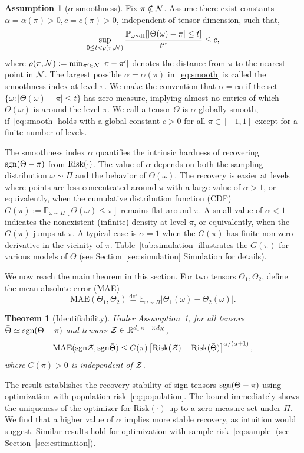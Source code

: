 \documentclass[11pt]{article}
\theoremstyle{plain}
\newtheorem{thm}{Theorem}
\theoremstyle{definition}
\newtheorem{assumption}{Assumption}
\def\sign{\textup{sgn}}
\def\risk{\textup{Risk}}
\begin{document}
\begin{assumption}[$\alpha$-smoothness]\label{ass:margin} 
Fix $\pi\notin \mathcal{N}$. Assume there exist constants $\alpha=\alpha(\pi)> 0, c=c(\pi) >0$, independent of tensor dimension, such that, 
\begin{equation}\label{eq:smooth}
\sup_{0\leq t<\rho(\pi, \mathcal{N})}{\mathbb{P}_{\omega \sim \Pi}[|\Theta (\omega)-\pi|\leq t ]\over t^\alpha} \leq c,
\end{equation}
where $\rho(\pi,\mathcal{N}):=\min_{\pi'\in \mathcal{N}}|\pi-\pi'|$ denotes the distance from $\pi$ to the nearest point in $\mathcal{N}$. The largest possible $\alpha=\alpha(\pi)$ in~\eqref{eq:smooth} is called the smoothness index at level $\pi$. We make the convention that $\alpha= \infty$ if the set $\{\omega\colon |\Theta(\omega)-\pi|\leq t\}$ has zero measure, implying almost no entries of which $\Theta(\omega)$ is around the level $\pi$. We call a tensor $\Theta$ is $\alpha$-globally smooth, if~\eqref{eq:smooth} holds with a global constant $c>0$ for all $\pi\in[-1,1]$ except for a finite number of levels. 
\end{assumption}

The smoothness index $\alpha$ quantifies the intrinsic hardness of recovering $\sign(\Theta-\pi)$ from $\risk(\cdot)$. 
The value of $\alpha$ depends on both the sampling distribution $\omega\sim \Pi$ and the behavior of $\Theta(\omega)$. 
The recovery is easier at levels where points are less concentrated around $\pi$ with a large value of $\alpha>1$, or equivalently, when the cumulative distribution function (CDF) $G(\pi):=\mathbb{P}_{\omega\sim \Pi}[\Theta(\omega)\leq \pi]$ remains flat around $\pi$. A small value of $\alpha<1$ indicates the nonexistent (infinite) density at level $\pi$, or equivalently, when the $G(\pi)$ jumps at $\pi$.  A typical case is $\alpha=1$ when the $G(\pi)$ has finite non-zero derivative in the vicinity of $\pi$. Table~\ref{tab:simulation} illustrates the $G(\pi)$ for various models of $\Theta$ (see Section~\ref{sec:simulation} Simulation for details). 

We now reach the main theorem in this section. For two tensors $\Theta_1,\Theta_2$, define the mean absolute error (MAE)
\[
\text{MAE}(\Theta_1, \Theta_2)\stackrel{\text{def}}{=}\mathbb{E}_{\omega\sim \Pi}|\Theta_1(\omega)-\Theta_2(\omega)|.
\]
\begin{thm}[Identifiability]\label{thm:population}Under Assumption~\ref{ass:margin}, for all tensors $\bar \Theta \simeq \sign(\Theta-\pi)$ and tensors $\mathcal{Z}\in\mathbb{R}^{d_1\times \cdots \times d_K}$,
\[
\textup{MAE}(\sign \tZ, \sign \bar \Theta) \leq C(\pi)\left[\textup{Risk}(\tZ)-\textup{Risk}( \bar \Theta)\right]^{\alpha/(\alpha+1)},
\]
where $C(\pi)>0$ is independent of $\mathcal{Z}$. 
\end{thm}
The result establishes the recovery stability of sign tensors $\sign (\Theta-\pi)$ using optimization with population risk~\eqref{eq:population}. The bound immediately shows the uniqueness of the optimizer  for $\text{Risk}(\cdot)$ up to a zero-measure set under $\Pi$. We find that a higher value of $\alpha$ implies more stable recovery, as intuition would suggest. Similar results hold for optimization with sample risk~\eqref{eq:sample} (see Section~\ref{sec:estimation}). 
\end{document}
